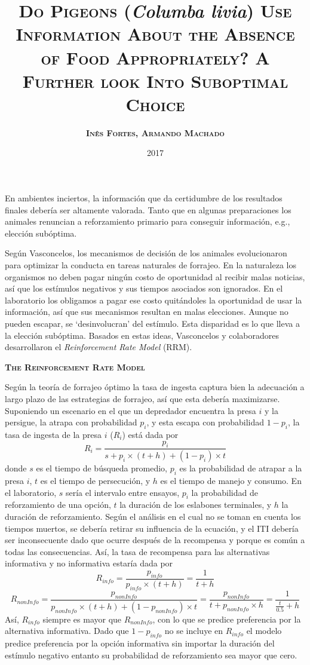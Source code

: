 \documentclass[a4paper,12pt]{article}
\title{{\scshape\bfseries Do Pigeons (}{\itshape\bfseries Columba livia}{\scshape\bfseries ) Use Information About the Absence of Food Appropriately? A Further look Into Suboptimal Choice}}
\author{\scshape\bfseries Inês Fortes, Armando Machado}
\date{2017}
\begin{document}
{\maketitle}

En ambientes inciertos, la información que da certidumbre de los resultados finales debería ser altamente valorada. Tanto que en algunas preparaciones los animales renuncian a reforzamiento primario para conseguir información, e.g., elección subóptima.

Según Vasconcelos, los mecanismos de decisión de los animales evolucionaron para optimizar la conducta en tareas naturales de forrajeo. En la naturaleza los organismos no deben pagar ningún costo de oportunidad al recibir malas noticias, así que los estímulos negativos y sus tiempos asociados son ignorados. En el laboratorio los obligamos a pagar ese costo quitándoles la oportunidad de usar la información, así que sus mecanismos resultan en malas elecciones. Aunque no pueden escapar, se `desinvolucran' del estímulo. Esta disparidad es lo que lleva a la elección subóptima. Basados en estas ideas, Vasconcelos y colaboradores desarrollaron el {\itshape Reinforcement Rate Model} (RRM).

{\scshape\bfseries The Reinforcement Rate Model}

Según la teoría de forrajeo óptimo la tasa de ingesta captura bien la adecuación a largo plazo de las estrategias de forrajeo, así que esta debería maximizarse. Suponiendo un escenario en el que un depredador encuentra la presa $i$ y la persigue, la atrapa con probabilidad $p_i$, y esta escapa con probabilidad $1-p_i$, la tasa de ingesta de la presa $i$ ($R_i$) está dada por
$$
R_i=\frac{p_i}{s+p_i\times (t+h) + (1-p_i)\times t}
$$
donde $s$ es el tiempo de búsqueda promedio, $p_i$ es la probabilidad de atrapar a la presa $i$, $t$ es el tiempo de persecución, y $h$ es el tiempo de manejo y consumo. En el laboratorio, $s$ sería el intervalo entre ensayos, $p_i$ la probabilidad de reforzamiento de una opción, $t$ la duración de los eslabones terminales, y $h$ la duración de reforzamiento. Según el análisis en el cual no se toman en cuenta los tiempos muertos, se debería retirar su influencia de la ecuación, y el ITI debería ser inconsecuente dado que ocurre después de la recompensa y porque es común a todas las consecuencias. Así, la tasa de recompensa para las alternativas informativa y no informativa estaría dada por
$$
R_{info}=\frac{p_{info}}{p_{info}\times (t+h)}=\frac 1{t+h}
$$
$$
R_{nonInfo}=\frac{p_{nonInfo}}{p_{nonInfo}\times(t+h)+(1-p_{nonInfo})\times t} = \frac{p_{nonInfo}}{t+p_{nonInfo}\times h} = \frac1{\frac{t}{0.5}+h}
$$
Así, $R_{info}$ siempre es mayor que $R_{nonInfo}$, con lo que se predice preferencia por la alternativa informativa. Dado que $1-p_{info}$ no se incluye en $R_{info}$ el modelo predice preferencia por la opción informativa sin importar la duración del estímulo negativo entanto su probabilidad de reforzamiento sea mayor que cero.
\end{document}

